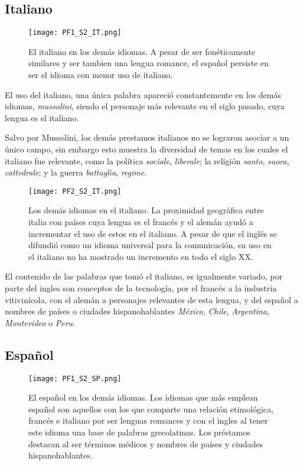 

\subsection{Italiano} %

\begin{figure}%
	\centering
	\texttt{[image: PF1\_S2\_IT.png]}
	\label{fig.ST_a_IT}
	\caption{El italiano en los demás idiomas. A pesar de ser fonéticamente similares y ser tambien una lengua romance,  el español persiste en ser el idioma con menor uso de italiano.}
\end{figure}
		
		
El uso del italiano, una única palabra apareció constantemente en los demás idiomas, \textit{mussolini}, siendo el personaje más relevante en el siglo pasado, cuya lengua es el italiano.  

Salvo por Mussolini, los demás prestamos italianos no se lograron asociar a un único campo, sin embargo esto muestra la diversidad de temas en los cuales el italiano fue relevante, como la política \textit{sociale}, \textit{liberale}; la religión \textit{santo}, \textit{suora}, \textit{cattedrale}; y la guerra \textit{battaglia}, \textit{regime}.


\begin{figure}%
	\centering
	\texttt{[image: PF2\_S2\_IT.png]}
	\label{fig.ST_b_IT}
	\caption{Los demás idiomas en el italiano. La proximidad geográfica  entre italia con países cuya lengua es el francés y el alemán ayudó a incrementar el uso de estos en el italiano. A pesar de que el inglés se difundió como un idioma universal para la comunicación, su uso en el italiano no ha mostrado un incremento en todo el siglo XX. }
\end{figure}

El contenido de las palabras que tomó el italiano, es igualmente variado, por parte del ingles son conceptos de la tecnología, por el francés a la industria vitivinícola, con el alemán a personajes relevantes de esta lengua, y del español a nombres de países o ciudades hispanohablantes \textit{México}, \textit{Chile}, \textit{Argentina}, \textit{Montevideo} o \textit{Peru}. 



\subsection{Español} %

\begin{figure}[h!] %
	\centering
	\texttt{[image: PF1\_S2\_SP.png]}
	\label{fig.ST_a_SP}
	\caption{El español en los demás idiomas. Los idiomas que más emplean español son aquellos con los que comparte una relación etimológica, francés e italiano por ser lenguas romances y con el ingles al tener este idioma una base de palabras grecolatinas.  Los préstamos destacan al ser términos médicos y nombres de países y ciudades hispanohablantes.   }
\end{figure}


